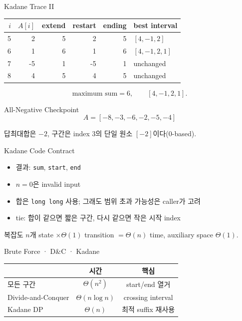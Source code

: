 \begin{frame}{Kadane Trace II}
\centering\scriptsize
\begin{tabular}{r|r|r|r|r|l}\toprule$i$&$A[i]$&extend&restart&ending&best interval\\\midrule
5&2&5&2&5&$[4,-1,2]$\\
6&1&6&1&6&$[4,-1,2,1]$\\
7&-5&1&-5&1&unchanged\\
8&4&5&4&5&unchanged\\\bottomrule
\end{tabular}
\[
\text{maximum sum}=6,\qquad [4,-1,2,1].
\]
\end{frame}
\begin{frame}{All-Negative Checkpoint}
\[
A=[-8,-3,-6,-2,-5,-4]
\]
\begin{exampleblock}{답}최대합은 $-2$, 구간은 index 3의 단일 원소 $[-2]$이다(0-based).\end{exampleblock}
\end{frame}
\begin{frame}{Kadane Code Contract}
\begin{itemize}\item 결과: \texttt{sum}, \texttt{start}, \texttt{end}\item $n=0$은 invalid input\item 합은 \texttt{long long} 사용; 그래도 범위 초과 가능성은 caller가 고려\item tie: 합이 같으면 짧은 구간, 다시 같으면 작은 시작 index\end{itemize}
\begin{block}{복잡도}
$n$개 state $\times\Theta(1)$ transition $=\Theta(n)$ time,
auxiliary space $\Theta(1)$.
\end{block}
\end{frame}
\begin{frame}{Brute Force · D\&C · Kadane}
\centering\begin{tabular}{lcc}&시간&핵심\\\midrule
모든 구간&$\Theta(n^2)$&start/end 열거\\
Divide-and-Conquer&$\Theta(n\log n)$&crossing interval\\
Kadane DP&$\Theta(n)$&최적 suffix 재사용\\\bottomrule
\end{tabular}
\vfill{}
\end{frame}
